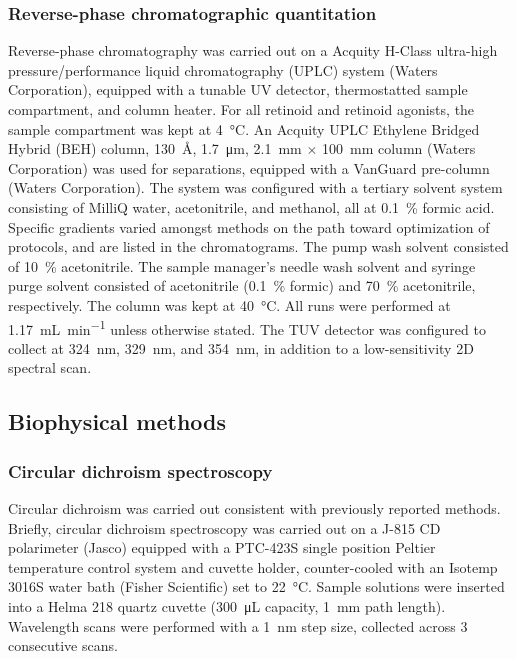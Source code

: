 \begin{refsection}
\subsubsection{Reverse-phase chromatographic quantitation}

Reverse-phase chromatography was carried out on a Acquity H-Class ultra-high
pressure/performance liquid chromatography (UPLC) system (Waters Corporation),
equipped with a tunable UV detector, thermostatted sample compartment, and
column heater. For all retinoid and retinoid agonists, the sample compartment
was kept at \SI{4}{\celsius}. An Acquity UPLC Ethylene Bridged Hybrid (BEH)  column,
\SI{130}{\angstrom}, \SI{1.7}{\um}, \SI{2.1}{\mm} ${\times}$ \SI{100}{\mm}
column (Waters Corporation) was used for separations, equipped with a VanGuard
 pre-column (Waters Corporation). The system was configured with a
tertiary solvent system consisting of MilliQ water, acetonitrile, and methanol,
all at \SI{0.1}{\percent} formic acid. Specific gradients varied amongst methods
on the path toward optimization of protocols, and are listed in the
chromatograms. The pump wash solvent consisted of \SI{10}{\percent}
acetonitrile. The sample manager's needle wash solvent and syringe purge solvent
consisted of acetonitrile (\SI{0.1}{\percent} formic) and \SI{70}{\percent}
acetonitrile, respectively. The column was kept at \SI{40}{\celsius}. All runs
were performed at \SI{1.17}{\mL\per\minute} unless otherwise stated. The TUV
detector was configured to collect at \SI{324}{\nm}, \SI{329}{\nm}, and
\SI{354}{\nm}, in addition to a low-sensitivity 2D spectral scan.

\subsection{Biophysical methods}

\subsubsection{Circular dichroism spectroscopy}

Circular dichroism was carried out consistent with previously reported
methods.\cite{Haghpanah2009,Gunasekar2009,Haghpanah2010,Yuvienco2012} Briefly,
circular dichroism spectroscopy was carried out on a J-815 CD polarimeter
(Jasco) equipped with a PTC-423S single position Peltier temperature control
system and cuvette holder, counter-cooled with an Isotemp 3016S water bath
(Fisher Scientific) set to \SI{22}{\celsius}. Sample solutions were inserted
into a Helma 218 quartz cuvette (\SI{300}{\uL} capacity, \SI{1}{\mm} path
length). Wavelength scans were performed with a \SI{1}{\nm} step size, collected
across 3 consecutive scans.


\end{refsection}
